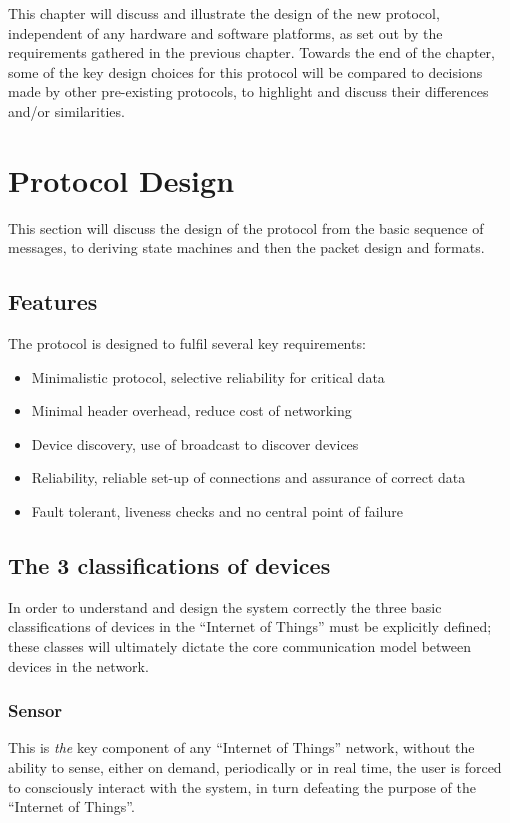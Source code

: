 
This chapter will discuss and illustrate the design of the new protocol, independent of any hardware and software platforms, as set out by the requirements gathered in the previous chapter. Towards the end of the chapter, some of the key design choices for this protocol will be compared to decisions made by other pre-existing protocols, to highlight and discuss their differences and/or similarities.


\section{Protocol Design} %
\label{sec:protocol_design}
This section will discuss the design of the protocol from the basic sequence of messages, to deriving state machines and then the packet design and formats.

\subsection{Features} %
\label{sub:features}
The protocol is designed to fulfil several key requirements:
\begin{itemize}
	\item Minimalistic protocol, selective reliability for critical data
	\item Minimal header overhead, reduce cost of networking
	\item Device discovery, use of broadcast to discover devices
	\item Reliability, reliable set-up of connections and assurance of correct data
	\item Fault tolerant, liveness checks and no central point of failure
\end{itemize}

\subsection{The 3 classifications of devices} %
\label{sub:the_3_classifications_of_devices}
In order to understand and design the system correctly the three basic classifications of devices in the ``Internet of Things'' must be explicitly defined; these classes will ultimately dictate the core communication model between devices in the network.

\subsubsection{Sensor} %
\label{ssub:sensor}
This is \textit{the} key component of any ``Internet of Things'' network, without the ability to sense, either on demand, periodically or in real time, the user is forced to consciously interact with the system, in turn defeating the purpose of the ``Internet of Things''.

